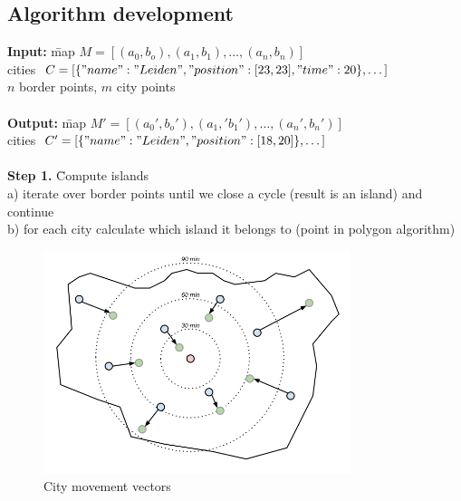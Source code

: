 \documentclass[a4paper,11pt]{article}
\newenvironment{boxedcode}
 {\setlength{\fboxsep}{1em}%
  \begin{lrbox}{\boxedcodebox}
  \begin{minipage}{\dimexpr\textwidth-2\fboxsep-2\fboxrule\relax}
  \begin{tabbing}}
 {\end{tabbing}
  \end{minipage}
  \end{lrbox}%
  \fbox{\usebox{\boxedcodebox}}}
\begin{document}
\subsection{Algorithm development}

\begin{center}
\begin{boxedcode}
  \textbf{Input:}
  \= map $M=[(a_0,b_o),(a_1, b_1),\dots, (a_n, b_n)]$\\
  \> cities $C=[\{"name":"Leiden", "position": [23,23],
  "time":20\},\dots]$\\
  \> $n$ border points, $m$ city points\\
  \\
  \textbf{Output:}
  \= map $M'=[(a_0',b_o'),(a_1,' b_1'),\dots, (a_n', b_n')]$\\
  \> cities $C'=[\{"name":"Leiden", "position": [18,20]\},\dots]$\\
  \\
  \textbf{Step 1.} \= Compute islands\\
  \> a) iterate over border points until we close a cycle (result is
  an island) and continue\\
  \> b) for each city calculate which island it belongs to (point in
  polygon algorithm)\\
\end{boxedcode}

\label{alg}
\end{center}


\begin{figure}[h!]
  \centering
  \includegraphics[width=0.8\textwidth]{forces.png}
  \caption{City movement vectors}
  \label{forces}
\end{figure}
\end{document}
